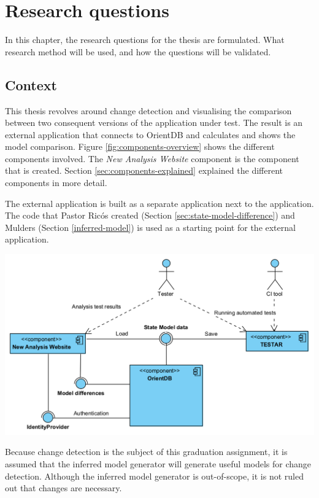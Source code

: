 \chapter{Research questions} \label{chapter:research}
In this chapter, the research questions for the thesis are formulated. What research method will be used, and how the questions will be validated.

\section{Context}
This thesis revolves around change detection and visualising the comparison between two consequent versions of the application under test. The result is an external application that connects to OrientDB and calculates and shows the model comparison. Figure \ref{fig:components-overview} shows the different components involved. The \textit{New Analysis Website} component is the component that is created. Section \ref{sec:components-explained} explained the different components in more detail.

The external application is built as a separate application next to the \testar application. The code that Pastor Ricós created (Section \ref{sec:state-model-difference}) and Mulders (Section \ref{inferred-model}) is used as a starting point for the external application. 

\begingroup
\captionsetup{type=figure}
\includegraphics[scale=0.4]{images/3-UML-high-level.png}
\label{fig:components-overview}
\endgroup

Because change detection is the subject of this graduation assignment, it is assumed that the inferred model generator will generate useful models for change detection. Although the inferred model generator is out-of-scope, it is not ruled out that changes are necessary.

